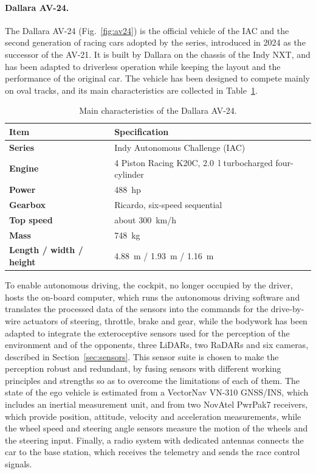 \paragraph{Dallara AV-24.} The Dallara AV-24 (Fig.~\ref{fig:av24}) is the official vehicle
of the IAC and the second generation of racing cars adopted by the series, introduced in 2024
as the successor of the AV-21. It is built by Dallara on the chassis of the Indy NXT, and has
been adapted to driverless operation while keeping the layout and the performance of the
original car. The vehicle has been designed to compete mainly on oval tracks, and its main
characteristics are collected in Table~\ref{tab:av24}.

\begin{table}[H]
    \centering
    \small
    \begin{tabular}{|p{}p{}|}
        \hline
        \rowcolor{bluepoli!40} \textbf{Item} & \textbf{Specification} \\
        \hline\hline
        \textbf{Series} & Indy Autonomous Challenge (IAC) \\
        \textbf{Engine} & 4 Piston Racing K20C, \SI{2.0}{l} turbocharged four-cylinder \\
        \textbf{Power} & \SI{488}{hp} \\
        \textbf{Gearbox} & Ricardo, six-speed sequential \\
        \textbf{Top speed} & about \SI{300}{km/h} \\
        \textbf{Mass} & \SI{748}{kg} \\
        \textbf{Length / width / height} & \SI{4.88}{m} / \SI{1.93}{m} / \SI{1.16}{m} \\
        \hline
    \end{tabular}
    \caption{Main characteristics of the Dallara AV-24.}
    \label{tab:av24}
\end{table}

To enable autonomous driving, the cockpit, no longer occupied by the driver, hosts the
on-board computer, which runs the autonomous driving software and translates the processed
data of the sensors into the commands for the drive-by-wire actuators of steering, throttle,
brake and gear, while the bodywork has been adapted to integrate the exteroceptive sensors used for
the perception of the environment and of the opponents, three LiDARs, two RaDARs and six
cameras, described in Section~\ref{sec:sensors}. This sensor suite is chosen to make the
perception robust and redundant, by fusing sensors with different working principles and
strengths so as to overcome the limitations of each of them. The state of the ego vehicle is
estimated from a VectorNav VN-310 GNSS/INS, which includes an inertial measurement unit, and
from two NovAtel PwrPak7 receivers, which provide position, attitude, velocity and
acceleration measurements, while the wheel speed and steering angle sensors measure the
motion of the wheels and the steering input. Finally, a radio system with dedicated antennas
connects the car to the base station, which receives the telemetry and sends the race
control signals.

